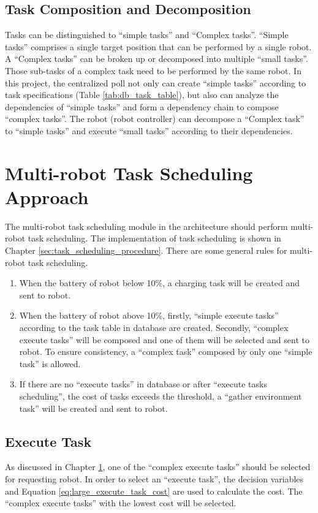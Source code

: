 \subsection{Task Composition and Decomposition}
Tasks can be distinguished to ``simple tasks'' and ``Complex tasks''.  ``Simple tasks'' comprises a single target position that can be performed by a single robot. A ``Complex tasks'' can be broken up or decomposed into multiple ``small tasks''. Those sub-tasks of a complex task need to be performed by the same robot.
In this project, the centralized poll not only can create ``simple tasks'' according to task specifications (Table \ref{tab:db_task_table}), but also can analyze the dependencies of ``simple tasks'' and form a dependency chain to compose ``complex tasks''. The robot (robot controller) can decompose a ``Complex task'' to ``simple tasks'' and execute ``small tasks'' according to their dependencies.

\section{Multi-robot Task Scheduling Approach}
\label{sec:task_scheduling_approach}

The multi-robot task scheduling module in the architecture should perform multi-robot task scheduling. 
The implementation of task scheduling is shown in Chapter \ref{sec:task_scheduling_procedure}. There are some general rules for multi-robot task scheduling.


\begin{enumerate}
	\item When the battery of robot below 10\%, a charging task will be created and sent to robot.
	\item When the battery of robot above 10\%, firstly, ``simple execute tasks'' according to the task table in database are created. Secondly, ``complex execute tasks'' will be composed and one of them will be selected and sent to robot. To ensure consistency, a ``complex task'' composed by only one ``simple task'' is allowed. 
    \item If there are no ``execute tasks'' in database or after ``execute tasks scheduling'', the cost of tasks exceeds the threshold, a ``gather environment task'' will be created and sent to robot.
\end{enumerate}

\subsection{Execute Task}
As discussed in Chapter \ref{sec:task_scheduling_approach}, one of the ``complex execute tasks'' should be selected for requesting robot. In order to select an ``execute task'', the decision variables and Equation \ref{eq:large_execute_task_cost} are used to calculate the cost. The ``complex execute tasks'' with the lowest cost will be selected.

